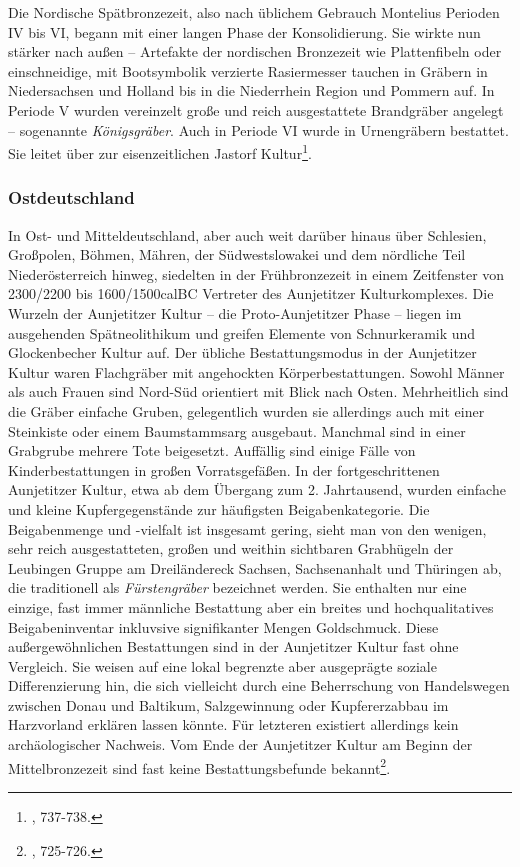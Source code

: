 \documentclass[openany,twoside,twocolumn]{book}
\let\rmarkdownfootnote\footnote%
\def\footnote{\protect\rmarkdownfootnote}
\begin{document}
Die Nordische Spätbronzezeit, also nach üblichem Gebrauch Montelius
Perioden IV bis VI, begann mit einer langen Phase der Konsolidierung.
Sie wirkte nun stärker nach außen -- Artefakte der nordischen Bronzezeit
wie Plattenfibeln oder einschneidige, mit Bootsymbolik verzierte
Rasiermesser tauchen in Gräbern in Niedersachsen und Holland bis in die
Niederrhein Region und Pommern auf. In Periode V wurden vereinzelt große
und reich ausgestattete Brandgräber angelegt -- sogenannte
\emph{Königsgräber}. Auch in Periode VI wurde in Urnengräbern bestattet.
Sie leitet über zur eisenzeitlichen Jastorf Kultur\footnote{\textcite{jockenhovel_germany_2013},
  737-738.}.

\hypertarget{ostdeutschland}{%
\subsubsection{Ostdeutschland}\label{ostdeutschland}}

In Ost- und Mitteldeutschland, aber auch weit darüber hinaus über
Schlesien, Großpolen, Böhmen, Mähren, der Südwestslowakei und dem
nördliche Teil Niederösterreich hinweg, siedelten in der Frühbronzezeit
in einem Zeitfenster von 2300/2200 bis 1600/1500calBC Vertreter des
Aunjetitzer Kulturkomplexes. Die Wurzeln der Aunjetitzer Kultur -- die
Proto-Aunjetitzer Phase -- liegen im ausgehenden Spätneolithikum und
greifen Elemente von Schnurkeramik und Glockenbecher Kultur auf. Der
übliche Bestattungsmodus in der Aunjetitzer Kultur waren Flachgräber mit
angehockten Körperbestattungen. Sowohl Männer als auch Frauen sind
Nord-Süd orientiert mit Blick nach Osten. Mehrheitlich sind die Gräber
einfache Gruben, gelegentlich wurden sie allerdings auch mit einer
Steinkiste oder einem Baumstammsarg ausgebaut. Manchmal sind in einer
Grabgrube mehrere Tote beigesetzt. Auffällig sind einige Fälle von
Kinderbestattungen in großen Vorratsgefäßen. In der fortgeschrittenen
Aunjetitzer Kultur, etwa ab dem Übergang zum 2. Jahrtausend, wurden
einfache und kleine Kupfergegenstände zur häufigsten Beigabenkategorie.
Die Beigabenmenge und -vielfalt ist insgesamt gering, sieht man von den
wenigen, sehr reich ausgestatteten, großen und weithin sichtbaren
Grabhügeln der Leubingen Gruppe am Dreiländereck Sachsen, Sachsenanhalt
und Thüringen ab, die traditionell als \emph{Fürstengräber} bezeichnet
werden. Sie enthalten nur eine einzige, fast immer männliche Bestattung
aber ein breites und hochqualitatives Beigabeninventar inkluvsive
signifikanter Mengen Goldschmuck. Diese außergewöhnlichen Bestattungen
sind in der Aunjetitzer Kultur fast ohne Vergleich. Sie weisen auf eine
lokal begrenzte aber ausgeprägte soziale Differenzierung hin, die sich
vielleicht durch eine Beherrschung von Handelswegen zwischen Donau und
Baltikum, Salzgewinnung oder Kupfererzabbau im Harzvorland erklären
lassen könnte. Für letzteren existiert allerdings kein archäologischer
Nachweis. Vom Ende der Aunjetitzer Kultur am Beginn der Mittelbronzezeit
sind fast keine Bestattungsbefunde bekannt\footnote{\textcite{jockenhovel_germany_2013},
  725-726.}.
\end{document}

